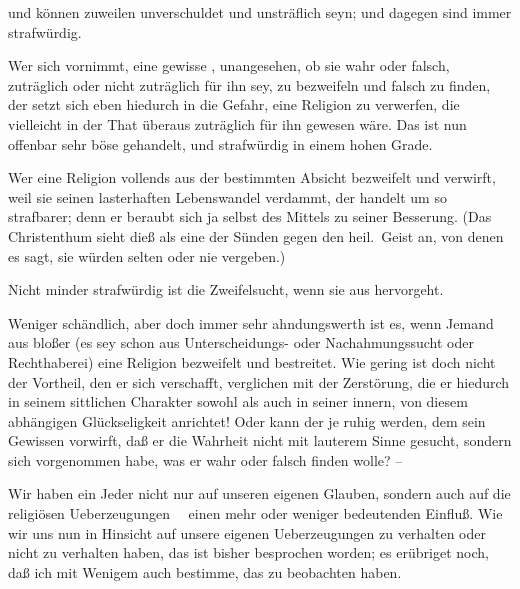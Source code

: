  und  können zuweilen unverschuldet und unsträflich seyn;  und  dagegen sind immer strafwürdig.
\begin{aufza}
\item Wer sich vornimmt, eine gewisse , unangesehen, ob sie wahr oder falsch, zuträglich oder nicht zuträglich für ihn sey, zu bezweifeln und falsch zu finden, der setzt sich eben hiedurch in die Gefahr, eine Religion zu verwerfen, die vielleicht in der That überaus zuträglich für ihn gewesen wäre. Das ist nun offenbar sehr böse gehandelt, und strafwürdig in einem hohen Grade.
\item Wer eine Religion vollends aus der bestimmten Absicht bezweifelt und verwirft, weil sie seinen lasterhaften Lebenswandel verdammt, der handelt um so strafbarer; denn er beraubt sich ja selbst des Mittels zu seiner Besserung. (Das Christenthum sieht dieß als eine der Sünden gegen den heil.\ Geist an, von denen es sagt, sie würden selten oder nie vergeben.)
\item Nicht minder strafwürdig ist die Zweifelsucht, wenn sie aus  hervorgeht.
\item Weniger schändlich, aber doch immer sehr ahndungswerth ist es, wenn Jemand aus bloßer  (es sey schon aus Unterscheidungs- oder Nachahmungssucht oder Rechthaberei) eine Religion bezweifelt und bestreitet. Wie gering ist doch nicht der Vortheil, den er sich verschafft, verglichen mit der Zerstörung, die er hiedurch in seinem sittlichen Charakter sowohl als auch in seiner innern, von diesem abhängigen Glückseligkeit anrichtet! Oder kann der je ruhig werden, dem sein Gewissen vorwirft, daß er die Wahrheit nicht mit lauterem Sinne gesucht, sondern sich vorgenommen habe, was er wahr oder falsch finden wolle? --
\end{aufza}

Wir haben ein Jeder nicht nur auf unseren eigenen Glauben, sondern auch auf die religiösen Ueberzeugungen~\  einen mehr oder weniger bedeutenden Einfluß. Wie wir uns nun in Hinsicht auf unsere eigenen Ueberzeugungen zu verhalten oder nicht zu verhalten haben, das ist bisher besprochen worden; es erübriget noch, daß ich mit Wenigem auch  bestimme, das  zu beobachten haben.

